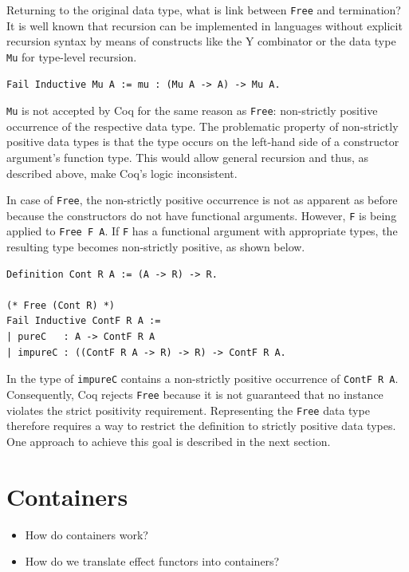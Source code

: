 \documentclass[a4paper, 11pt, fleqn, twoside]{scrreprt}
\begin{document}
Returning to the original data type, what is link between \texttt{Free} and termination?
It is well known that recursion can be implemented in languages without explicit recursion syntax by means of constructs like the Y combinator or the data type \texttt{Mu} for type-level recursion.

\begin{verbatim}
Fail Inductive Mu A := mu : (Mu A -> A) -> Mu A.
\end{verbatim}

\texttt{Mu} is not accepted by Coq for the same reason as \texttt{Free}: non-strictly positive occurrence of the respective data type.
The problematic property of non-strictly positive data types is that the type occurs on the left-hand side of a constructor argument's function type.
This would allow general recursion and thus, as described above, make Coq's logic inconsistent.

In case of \texttt{Free}, the non-strictly positive occurrence is not as apparent as before because the constructors do not have functional arguments.
However, \texttt{F} is being applied to \texttt{Free F A}.
If \texttt{F} has a functional argument with appropriate types, the resulting type becomes non-strictly positive, as shown below.

\begin{verbatim}
Definition Cont R A := (A -> R) -> R.

(* Free (Cont R) *)
Fail Inductive ContF R A :=
| pureC   : A -> ContF R A
| impureC : ((ContF R A -> R) -> R) -> ContF R A.
\end{verbatim}

In the type of \texttt{impureC} contains a non-strictly positive occurrence of \texttt{ContF R A}.
Consequently, Coq rejects \texttt{Free} because it is not guaranteed that no instance violates the strict positivity requirement.
Representing the \texttt{Free} data type therefore requires a way to restrict the definition to strictly positive data types.
One approach to achieve this goal is described in the next section.

\section{Containers}

\begin{itemize}
\item How do containers work?
\item How do we translate effect functors into containers?
\end{itemize}
\end{document}
